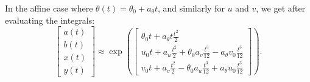 \begin{important}
  In the affine case where $\theta(t) = \theta_0 + a_\theta t$, and similarly for $u$ and $v$, we get after evaluating the integrals:
  \begin{equation*}
    \begin{bmatrix}
      a(t) \\
      b(t) \\
      x(t) \\
      y(t)
    \end{bmatrix} \approx \exp \left( \begin{bmatrix} \theta_0 t + a_\theta t \frac{t^2}{2}                                                 \\
      u_0 t + a_u \frac{t^2}{2} + \theta_0 a_v \frac{t^3}{12} - a_\theta v_0 \frac{t^3}{12} \\
      v_0 t + a_v \frac{t^2}{2} - \theta_0 a_u \frac{t^3}{12} + a_\theta u_0 \frac{t^3}{12}\end{bmatrix} \right).
  \end{equation*}
\end{important}